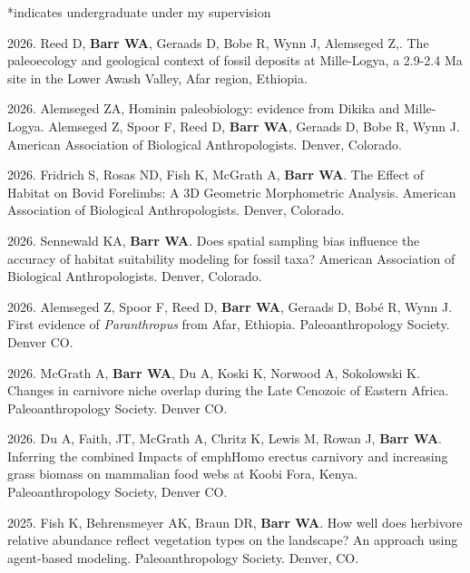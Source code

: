 \documentclass{article}
\newenvironment{mylist}
{\begin{description}[style=unboxed,leftmargin=1.3cm]}
{\end{description}}
\begin{document}
\begin{mylist}
\item[] *indicates undergraduate under my supervision
\end{mylist}

\begin{etaremune}

\item 2026. Reed D, {\bfseries Barr WA}, Geraads D, Bobe R, Wynn J, Alemseged Z,. The paleoecology and geological context of fossil deposits at Mille-Logya, a 2.9-2.4 Ma site in the Lower Awash Valley, Afar region, Ethiopia. 

\item 2026. Alemseged ZA, Hominin paleobiology: evidence from Dikika and Mille-Logya. Alemseged Z, Spoor F, Reed D, {\bfseries Barr WA}, Geraads D, Bobe R, Wynn J. American Association of Biological Anthropologists. Denver, Colorado.

\item 2026.  Fridrich S, Rosas ND, Fish K, McGrath A, {\bfseries Barr WA}. The Effect of Habitat on Bovid Forelimbs: A 3D Geometric Morphometric Analysis. American Association of Biological Anthropologists. Denver, Colorado.

\item 2026. Sennewald KA, {\bfseries Barr WA}. Does spatial sampling bias influence the accuracy of habitat suitability modeling for fossil taxa? American Association of Biological Anthropologists. Denver, Colorado.

\item 2026.  Alemseged Z, Spoor F, Reed D, {\bfseries Barr WA}, Geraads D, Bobé R, Wynn J. First evidence of \emph{Paranthropus} from Afar, Ethiopia. Paleoanthropology Society. Denver CO.

\item 2026. McGrath A, {\bfseries Barr WA}, Du A, Koski K, Norwood A, Sokolowski K. Changes in carnivore niche overlap during the Late Cenozoic of Eastern Africa. Paleoanthropology Society. Denver CO.

\item 2026.  Du A, Faith, JT, McGrath A, Chritz K, Lewis M, Rowan J, {\bfseries Barr WA}. Inferring the combined Impacts of emph{Homo erectus} carnivory and increasing grass biomass on mammalian food webs at Koobi Fora, Kenya. Paleoanthropology Society, Denver CO. 

\item 2025.  Fish K, Behrensmeyer AK, Braun DR, {\bfseries Barr WA}. How well does herbivore relative abundance reflect vegetation types on the landscape? An approach using agent-based modeling. Paleoanthropology Society.  Denver, CO.


\end{etaremune}
\end{document}

